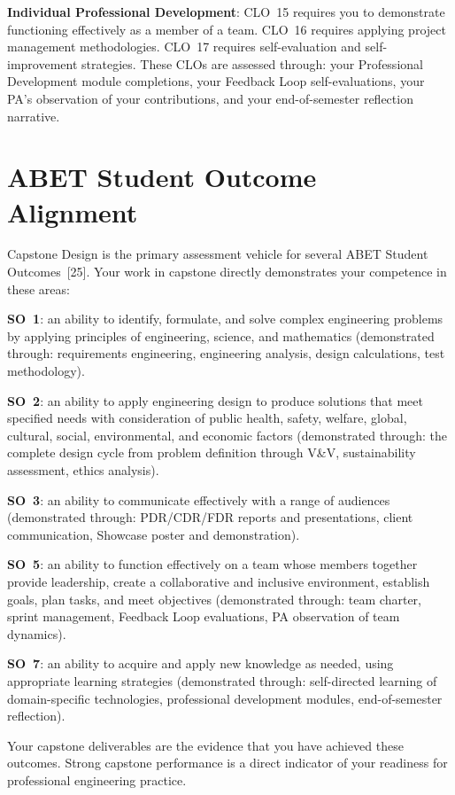 \textbf{Individual Professional Development}: CLO~15 requires you to demonstrate functioning effectively as a member of a team. CLO~16 requires applying project management methodologies. CLO~17 requires self-evaluation and self-improvement strategies. These CLOs are assessed through: your Professional Development module completions, your Feedback Loop self-evaluations, your PA's observation of your contributions, and your end-of-semester reflection narrative.

\section{ABET Student Outcome Alignment}
Capstone Design is the primary assessment vehicle for several ABET Student Outcomes~[25]. Your work in capstone directly demonstrates your competence in these areas:

\textbf{SO~1}: an ability to identify, formulate, and solve complex engineering problems by applying principles of engineering, science, and mathematics (demonstrated through: requirements engineering, engineering analysis, design calculations, test methodology).

\textbf{SO~2}: an ability to apply engineering design to produce solutions that meet specified needs with consideration of public health, safety, welfare, global, cultural, social, environmental, and economic factors (demonstrated through: the complete design cycle from problem definition through V\&V, sustainability assessment, ethics analysis).

\textbf{SO~3}: an ability to communicate effectively with a range of audiences (demonstrated through: PDR/CDR/FDR reports and presentations, client communication, Showcase poster and demonstration).

\textbf{SO~5}: an ability to function effectively on a team whose members together provide leadership, create a collaborative and inclusive environment, establish goals, plan tasks, and meet objectives (demonstrated through: team charter, sprint management, Feedback Loop evaluations, PA observation of team dynamics).

\textbf{SO~7}: an ability to acquire and apply new knowledge as needed, using appropriate learning strategies (demonstrated through: self-directed learning of domain-specific technologies, professional development modules, end-of-semester reflection).

Your capstone deliverables are the evidence that you have achieved these outcomes. Strong capstone performance is a direct indicator of your readiness for professional engineering practice.

